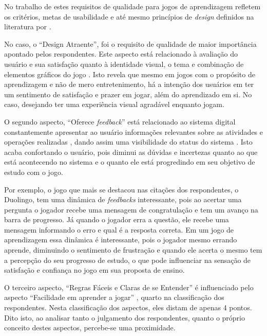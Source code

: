 No trabalho de  estes requisitos de qualidade para jogos de aprendizagem refletem os critérios, metas de usabilidade e até mesmo princípios de \textit{design} definidos na literatura por .

No caso, o ``Design Atraente'', foi o requisito de qualidade de maior importância apontado pelos respondentes. Este aspecto está relacionado à avaliação do usuário e sua satisfação quanto à identidade visual, o tema e combinação de elementos gráficos do jogo \cite{silva_sales_mendes2021}. Isto revela que mesmo em jogos com o propósito de aprendizagem e não de mero entretenimento, há a intenção dos usuários em ter um sentimento de satisfação e prazer em jogar, além do aprendizado em si. No caso, desejando ter uma experiência visual agradável enquanto jogam.

O segundo aspecto, ``Oferece \textit{feedback}'' está relacionado ao sistema digital constantemente apresentar ao usuário informações relevantes sobre as atividades e operações realizadas \cite{silva_sales_mendes2021}, dando assim uma visibilidade do status do sistema \cite{Preece_Rogers_Sharp_2005}. Isto acaba confortando o usuário, pois diminui as dúvidas e incertezas quanto ao que está acontecendo no sistema e o quanto ele está progredindo em seu objetivo de estudo com o jogo. 

Por exemplo, o jogo que mais se destacou nas citações dos respondentes, o Duolingo, tem uma dinâmica de \textit{feedbacks} interessante, pois ao acertar uma pergunta o jogador recebe uma mensagem de congratulação e tem um avanço na barra de progresso. Já quando o jogador erra a questão, ele recebe uma mensagem informando o erro e qual é a resposta correta. Em um jogo de aprendizagem essa dinâmica é interessante, pois o jogador mesmo errando aprende, diminuindo o sentimento de frustração e quando ele acerta o mesmo tem a percepção do seu progresso de estudo, o que pode influenciar na sensação de satisfação e confiança no jogo em sua proposta de ensino.

O terceiro aspecto, ``Regras Fáceis e Claras de se Entender'' é influenciado pelo aspecto ``Facilidade em aprender a jogar'' \cite{Petri_Wangenheim_2019}, quarto na classificação dos respondentes. Nesta classificação dos aspectos, eles distam de apenas 4 pontos. Dito isto, ao analisar tanto o julgamento dos respondentes, quanto o próprio conceito destes aspectos, percebe-se uma proximidade. 

